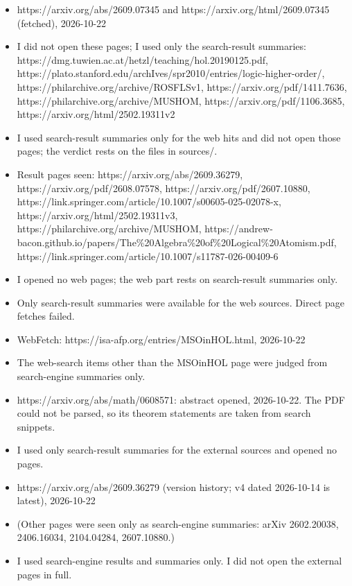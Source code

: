 \documentclass{article}
\begin{document}
\begin{itemize}
\item https://arxiv.org/abs/2609.07345 and https://arxiv.org/html/2609.07345 (fetched), 2026-10-22
\item I did not open these pages; I used only the search-result summaries: https://dmg.tuwien.ac.at/hetzl/teaching/hol.20190125.pdf, https://plato.stanford.edu/archIves/spr2010/entries/logic-higher-order/, https://philarchive.org/archive/ROSFLSv1, https://arxiv.org/pdf/1411.7636, https://philarchive.org/archive/MUSHOM, https://arxiv.org/pdf/1106.3685, https://arxiv.org/html/2502.19311v2
\item I used search-result summaries only for the web hits and did not open those pages; the verdict rests on the files in sources/.
\item Result pages seen: https://arxiv.org/abs/2609.36279, https://arxiv.org/pdf/2608.07578, https://arxiv.org/pdf/2607.10880, https://link.springer.com/article/10.1007/s00605-025-02078-x, https://arxiv.org/html/2502.19311v3, https://philarchive.org/archive/MUSHOM, https://andrew-bacon.github.io/papers/The\%20Algebra\%20of\%20Logical\%20Atomism.pdf, https://link.springer.com/article/10.1007/s11787-026-00409-6
\item I opened no web pages; the web part rests on search-result summaries only.
\item Only search-result summaries were available for the web sources. Direct page fetches failed.
\item WebFetch: https://isa-afp.org/entries/MSOinHOL.html, 2026-10-22
\item The web-search items other than the MSOinHOL page were judged from search-engine summaries only.
\item https://arxiv.org/abs/math/0608571: abstract opened, 2026-10-22. The PDF could not be parsed, so its theorem statements are taken from search snippets.
\item I used only search-result summaries for the external sources and opened no pages.
\item https://arxiv.org/abs/2609.36279 (version history; v4 dated 2026-10-14 is latest), 2026-10-22
\item (Other pages were seen only as search-engine summaries: arXiv 2602.20038, 2406.16034, 2104.04284, 2607.10880.)
\item I used search-engine results and summaries only. I did not open the external pages in full.
\end{itemize}
\end{document}
